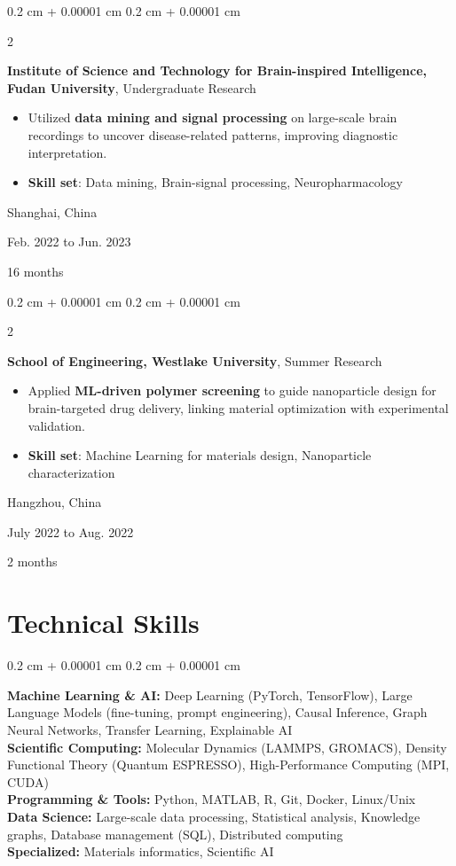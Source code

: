 \documentclass[10pt, letterpaper]{article}
\newenvironment{highlights}{
    \begin{itemize}[
        topsep=0.10 cm,
        parsep=0.10 cm,
        partopsep=0pt,
        itemsep=0pt,
        leftmargin=0.4 cm + 10pt
    ]
}{
    \end{itemize}
} %
\newenvironment{onecolentry}{
    \begin{adjustwidth}{
        0.2 cm + 0.00001 cm
    }{
        0.2 cm + 0.00001 cm
    }
}{
    \end{adjustwidth}
} %
\newenvironment{twocolentry}[2][]{
    \onecolentry
    \def\secondColumn{#2}
    \setcolumnwidth{\fill, 4.5 cm}
    \begin{paracol}{2}
}{
    \switchcolumn \raggedleft \secondColumn
    \end{paracol}
    \endonecolentry
} %
\begin{document}
\begin{twocolentry}{
Shanghai, China

Feb. 2022 to Jun. 2023

16 months


}
\textbf{Institute of Science and Technology for Brain-inspired Intelligence, Fudan University}, Undergraduate Research
\begin{highlights}
\item Utilized \textbf{data mining and signal processing} on large-scale brain recordings to uncover disease-related patterns, improving diagnostic interpretation.
\item \textbf{Skill set}: Data mining, Brain-signal processing, Neuropharmacology
\end{highlights}
\end{twocolentry}
\vspace{0.2 cm}


\begin{twocolentry}{
Hangzhou, China

July 2022 to Aug. 2022

2 months


}
\textbf{School of Engineering, Westlake University}, Summer Research
\begin{highlights}
\item Applied \textbf{ML-driven polymer screening} to guide nanoparticle design for brain-targeted drug delivery, linking material optimization with experimental validation.
\item \textbf{Skill set}: Machine Learning for materials design, Nanoparticle characterization
\end{highlights}
\end{twocolentry}

\section{Technical Skills}
\begin{onecolentry}
\textbf{Machine Learning \& AI:} Deep Learning (PyTorch, TensorFlow), Large Language Models (fine-tuning, prompt engineering), Causal Inference, Graph Neural Networks, Transfer Learning, Explainable AI\\
\textbf{Scientific Computing:} Molecular Dynamics (LAMMPS, GROMACS), Density Functional Theory (Quantum ESPRESSO), High-Performance Computing (MPI, CUDA)\\
\textbf{Programming \& Tools:} Python, MATLAB, R, Git, Docker, Linux/Unix\\
\textbf{Data Science:} Large-scale data processing, Statistical analysis, Knowledge graphs, Database management (SQL), Distributed computing\\
\textbf{Specialized:} Materials informatics, Scientific AI
\end{onecolentry}
\end{document}
